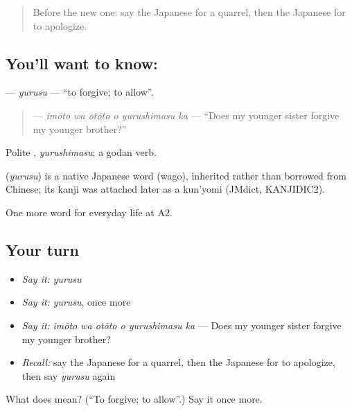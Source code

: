 \label{lesson:JA-C246-yurusu}



\begin{quote}
Before the new one: say the Japanese for a quarrel, then the Japanese for to apologize.
\end{quote}

\subsection*{You'll want to know: }
\textbf{} — \emph{yurusu} — \textquotedblleft{}to forgive; to allow\textquotedblright{}.

\begin{quote}
\textbf{  } — \emph{imōto wa otōto o yurushimasu ka} — \textquotedblleft{}Does my younger sister forgive my younger brother?\textquotedblright{}
\end{quote}

Polite \textbf{}, \emph{yurushimasu}; a godan verb.

\begin{cousinweb}
\textbf{} (\emph{yurusu}) is a native Japanese word (wago), inherited rather than borrowed from Chinese; its kanji was attached later as a kun'yomi (JMdict, KANJIDIC2).
\end{cousinweb}

\begin{grammarlens}[title={What you've built}]
One more word for everyday life at A2.
\end{grammarlens}

\subsection*{Your turn}
\begin{itemize}
\raggedright
  \item \emph{Say it:} \emph{yurusu}
  \item \emph{Say it:} \emph{yurusu}, once more
  \item \emph{Say it:} \emph{imōto wa otōto o yurushimasu ka} — Does my younger sister forgive my younger brother?
  \item \emph{Recall:} say the Japanese for a quarrel, then the Japanese for to apologize, then say \emph{yurusu} again
\end{itemize}

\begin{tcolorbox}[breakable,colback=teal!4,colframe=teal!35!black,title={Before you move on}]
What does  mean? (\textquotedblleft{}To forgive; to allow\textquotedblright{}.) Say it once more.
\end{tcolorbox}
